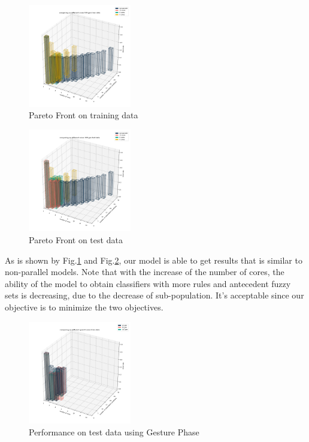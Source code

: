 \documentclass[conference]{IEEEtran}
\begin{document}
  \begin{figure}[H]
    \centering
    \includegraphics[width=0.4\textwidth]{figures/diffCoreTrain.png}
    \caption{Pareto Front on training data}\label{diffCoreTr}
  \end{figure}
  \begin{figure}[H]
    \centering
    \includegraphics[width=0.4\textwidth]{figures/diffCoreTest.png}
    \caption{Pareto Front on test data}\label{diffCoreT}
  \end{figure}
  As is shown by Fig.\ref{diffCoreTr} and Fig.\ref{diffCoreT}, our model is able to get results that is similar to non-parallel models. Note that with the increase of the number of cores, the ability of the model to obtain classifiers with more rules and antecedent fuzzy sets is decreasing, due to the decrease of sub-population. It's acceptable since our objective is to minimize the two objectives.
  \begin{figure}[H]
    \centering
    \includegraphics[width=0.4\textwidth]{figures/diffGenTrain.png}
    \caption{Performance on test data using Gesture Phase}\label{phTr}
  \end{figure}
\end{document}
